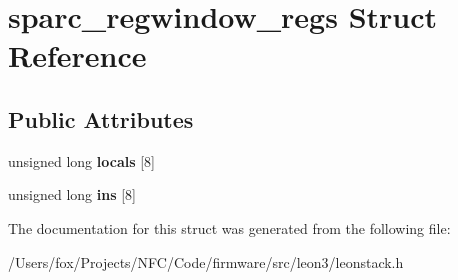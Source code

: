 \hypertarget{structsparc__regwindow__regs}{
\section{sparc\_\-regwindow\_\-regs Struct Reference}
\label{structsparc__regwindow__regs}
}
\subsection*{Public Attributes}
\begin{DoxyCompactItemize}
\item 
\hypertarget{structsparc__regwindow__regs_aae505cc9eb0bc7af20285c43b99d88dc}{
unsigned long {\bfseries locals} \mbox{[}8\mbox{]}}
\label{structsparc__regwindow__regs_aae505cc9eb0bc7af20285c43b99d88dc}

\item 
\hypertarget{structsparc__regwindow__regs_afba18b7b13133e3242dffafc0f49f44e}{
unsigned long {\bfseries ins} \mbox{[}8\mbox{]}}
\label{structsparc__regwindow__regs_afba18b7b13133e3242dffafc0f49f44e}

\end{DoxyCompactItemize}


The documentation for this struct was generated from the following file:\begin{DoxyCompactItemize}
\item 
/Users/fox/Projects/NFC/Code/firmware/src/leon3/leonstack.h\end{DoxyCompactItemize}
